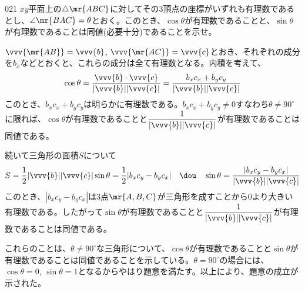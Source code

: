 \begin{prob}{021}{}{}
 $xy$平面上の$\triangle\mr{ABC}$に対してその3頂点の座標がいずれも有理数であるとし、$\angle\mr{BAC}=\theta$とおく。このとき、$\cos\theta$が有理数であることと、$\sin\theta$が有理数であることは同値(必要十分)であることを示せ。
\end{prob}

$\vvv{\mr{AB}}=\vvv{b}$, $\vvv{\mr{AC}}=\vvv{c}$とおき、それぞれの成分を$b_x$などとおくと、これらの成分は全て有理数となる。内積を考えて、
\[ \cos\theta=\frac{\vvv{b}\cdot\vvv{c}}{|\vvv{b}||\vvv{c}|}=\frac{b_xc_x+b_yc_y}{|\vvv{b}||\vvv{c}|} \]
このとき、$b_xc_x+b_yc_y$は明らかに有理数である。$b_xc_x+b_yc_y\neq 0$すなわち$\theta\neq 90^\circ$に限れば、$\cos\theta$が有理数であることと$\dfrac{1}{|\vvv{b}||\vvv{c}|}$が有理数であることは同値である。

続いて三角形の面積$S$について
\[ S=\frac{1}{2}|\vvv{b}||\vvv{c}|\sin\theta=\frac{1}{2}|b_xc_y-b_yc_x| \quad\dou\quad \sin\theta=\frac{|b_xc_y-b_yc_x|}{|\vvv{b}||\vvv{c}|} \]
このとき、$|b_xc_y-b_yc_x|$は3点$\mr{A,B,C}$が三角形を成すことから0より大きい有理数である。したがって$\sin\theta$が有理数であることと$\dfrac{1}{|\vvv{b}||\vvv{c}|}$が有理数であることは同値である。

これらのことは、$\theta\neq 90^\circ$な三角形について、$\cos\theta$が有理数であることと$\sin\theta$が有理数であることは同値であることを示している。$\theta=90^\circ$の場合には、$\cos\theta=0$, $\sin\theta=1$となるからやはり題意を満たす。以上により、題意の成立が示された。